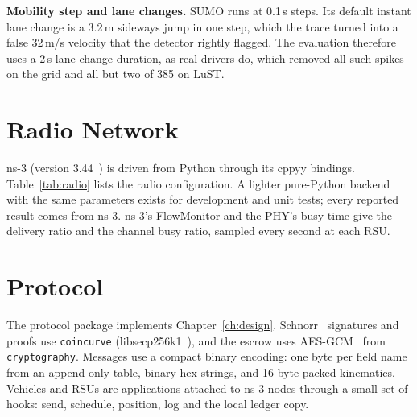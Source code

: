 \textbf{Mobility step and lane changes.} SUMO runs at 0.1\,s steps. Its default instant lane change
is a 3.2\,m sideways jump in one step, which the trace turned into a false 32\,m/s velocity that the
detector rightly flagged. The evaluation therefore uses a 2\,s lane-change duration, as real drivers
do, which removed all such spikes on the grid and all but two of 385 on LuST.

\section{Radio Network}

\begin{table}[htbp]\centering\small
\caption{IEEE 802.11p parameters in ns-3}\label{tab:radio}
\end{table}

ns-3 (version 3.44~\cite{riley2010ns3}) is driven from Python through its cppyy bindings.
Table~\ref{tab:radio} lists the radio configuration. A lighter pure-Python backend with the same
parameters exists for development and unit tests; every reported result comes from ns-3. ns-3's
FlowMonitor and the PHY's busy time give the delivery ratio and the channel busy ratio, sampled every
second at each RSU.

\section{Protocol}

The protocol package implements Chapter~\ref{ch:design}. Schnorr~\cite{schnorr1991} signatures and
proofs use \texttt{coincurve} (libsecp256k1~\cite{sec2}), and the escrow uses AES-GCM~\cite{nist80038d} from
\texttt{cryptography}. Messages use a compact binary encoding: one byte per field
name from an append-only table, binary hex strings, and 16-byte packed kinematics. Vehicles and RSUs
are applications attached to ns-3 nodes through a small set of hooks: send, schedule, position, log
and the local ledger copy.

